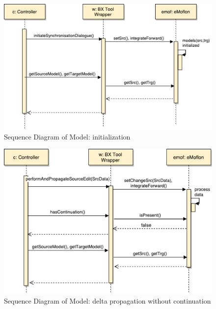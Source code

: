 \begin{figure}
	\centering
	\includegraphics[width=1\textwidth]{figures/Sequence_Diagram-Model(init)}
	\caption{Sequence Diagram of Model: initialization}
	\label{fig:Sequence_Diagram-Model(init)}
\end{figure}

\begin{figure}
	\centering
	\includegraphics[width=1\textwidth]{figures/Sequence_Diagram-Model(cont-false)}
	\caption{Sequence Diagram of Model: delta propagation without continuation}
	\label{fig:Sequence_Diagram-Model(cont-false)}
\end{figure}


